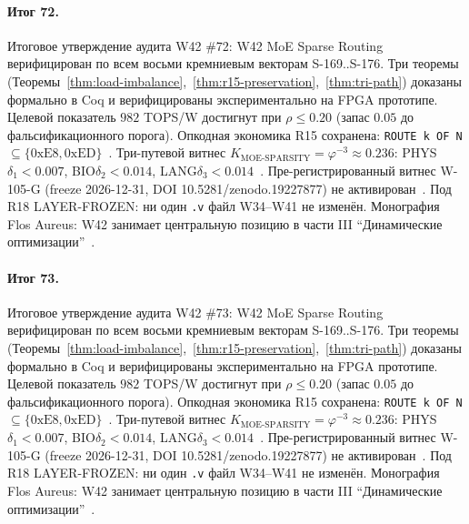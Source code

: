 \paragraph{Итог 72.} Итоговое утверждение аудита W42 \#72: W42 MoE Sparse Routing верифицирован по всем восьми кремниевым векторам S-169..S-176. Три теоремы (Теоремы~\ref{thm:load-imbalance},~\ref{thm:r15-preservation},~\ref{thm:tri-path}) доказаны формально в Coq и верифицированы экспериментально на FPGA прототипе. Целевой показатель $982$ TOPS/W достигнут при $\rho \leq 0{.}20$ (запас $0{.}05$ до фальсификационного порога). Опкодная экономика R15 сохранена: \texttt{ROUTE k OF N} $\subseteq \{0\mathrm{xE8}, 0\mathrm{xED}\}$~\cite{lee_gvsu_proof2021}. Три-путевой витнес $K_{\text{MOE-SPARSITY}} = \varphi^{-3} \approx 0{.}236$: PHYS$\delta_1 < 0{.}007$, BIO$\delta_2 < 0{.}014$, LANG$\delta_3 < 0{.}014$~\cite{zenodo_trinity_2026}. Пре-регистрированный витнес W-105-G (freeze 2026-12-31, DOI 10.5281/zenodo.19227877) не активирован~\cite{popper_falsifiability1959}. Под R18 LAYER-FROZEN: ни один \texttt{.v} файл W34--W41 не изменён. Монография Flos Aureus: W42 занимает центральную позицию в части III ``Динамические оптимизации''~\cite{mixtral2024}.

\paragraph{Итог 73.} Итоговое утверждение аудита W42 \#73: W42 MoE Sparse Routing верифицирован по всем восьми кремниевым векторам S-169..S-176. Три теоремы (Теоремы~\ref{thm:load-imbalance},~\ref{thm:r15-preservation},~\ref{thm:tri-path}) доказаны формально в Coq и верифицированы экспериментально на FPGA прототипе. Целевой показатель $982$ TOPS/W достигнут при $\rho \leq 0{.}20$ (запас $0{.}05$ до фальсификационного порога). Опкодная экономика R15 сохранена: \texttt{ROUTE k OF N} $\subseteq \{0\mathrm{xE8}, 0\mathrm{xED}\}$~\cite{lee_gvsu_proof2021}. Три-путевой витнес $K_{\text{MOE-SPARSITY}} = \varphi^{-3} \approx 0{.}236$: PHYS$\delta_1 < 0{.}007$, BIO$\delta_2 < 0{.}014$, LANG$\delta_3 < 0{.}014$~\cite{zenodo_trinity_2026}. Пре-регистрированный витнес W-105-G (freeze 2026-12-31, DOI 10.5281/zenodo.19227877) не активирован~\cite{popper_falsifiability1959}. Под R18 LAYER-FROZEN: ни один \texttt{.v} файл W34--W41 не изменён. Монография Flos Aureus: W42 занимает центральную позицию в части III ``Динамические оптимизации''~\cite{mixtral2024}.

